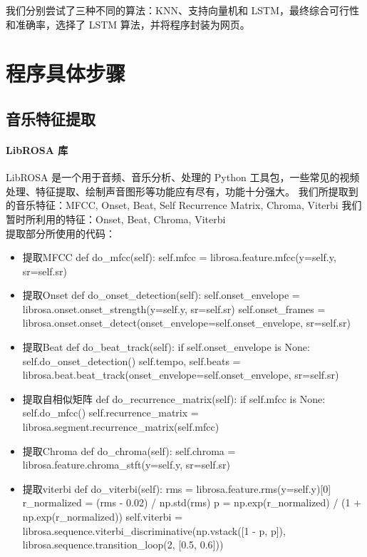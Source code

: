\documentclass[a4paper,utf8,10pt]{article}
\begin{document}
我们分别尝试了三种不同的算法：KNN、支持向量机和 LSTM，最终综合可行性和准确率，选择了 LSTM 算法，并将程序封装为网页。

\section{程序具体步骤}
\subsection{音乐特征提取}
\paragraph{LibROSA 库} LibROSA 是一个用于音频、音乐分析、处理的 Python 工具包，一些常见的视频处理、特征提取、绘制声音图形等功能应有尽有，功能十分强大。
我们所提取到的音乐特征：MFCC, Onset, Beat, Self Recurrence Matrix, Chroma, Viterbi
我们暂时所利用的特征：Onset, Beat, Chroma, Viterbi
\\
提取部分所使用的代码：
\noindent\begin{itemize}
\item 提取MFCC
    def do_mfcc(self):   
        self.mfcc = librosa.feature.mfcc(y=self.y, sr=self.sr)
    
\item 提取Onset
    def do_onset_detection(self):  
        self.onset_envelope = librosa.onset.onset_strength(y=self.y, sr=self.sr)
        self.onset_frames = librosa.onset.onset_detect(onset_envelope=self.onset_envelope, sr=self.sr)
        
\item 提取Beat
    def do_beat_track(self):  
        if self.onset_envelope is None:
            self.do_onset_detection()
        self.tempo, self.beats = librosa.beat.beat_track(onset_envelope=self.onset_envelope, sr=self.sr)
        
\item 提取自相似矩阵
    def do_recurrence_matrix(self):   
        if self.mfcc is None:
            self.do_mfcc()
        self.recurrence_matrix = librosa.segment.recurrence_matrix(self.mfcc)

\item 提取Chroma
    def do_chroma(self):
        self.chroma = librosa.feature.chroma_stft(y=self.y, sr=self.sr)

\item 提取viterbi
    def do_viterbi(self):
        rms = librosa.feature.rms(y=self.y)[0]
        r_normalized = (rms - 0.02) / np.std(rms)
        p = np.exp(r_normalized) / (1 + np.exp(r_normalized))
        self.viterbi = librosa.sequence.viterbi_discriminative(np.vstack([1 - p, p]), librosa.sequence.transition_loop(2, [0.5, 0.6]))
\end{itemize}
\end{document}
